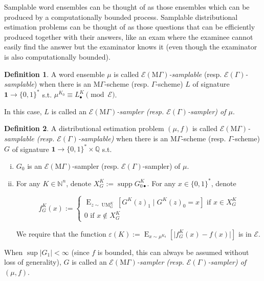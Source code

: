\documentclass{article}
\numberwithin{equation}{section}
\theoremstyle{definition}
\newtheorem{definition}{Definition}[section]
\theoremstyle{plain}
\newcommand{\Bool}{\{0,1\}}
\newcommand{\Words}{{\Bool^*}}
\DeclareMathOperator{\Supp}{supp}
\DeclareMathOperator{\E}{E}
\DeclareMathOperator{\UM}{UM}
\newcommand{\Nats}{\mathbb{N}}
\newcommand{\Rats}{\mathbb{Q}}
\newcommand{\Abs}[1]{\lvert #1 \rvert}
\newcommand{\MGrow}{\mathrm{M}\Gamma}
\newcommand{\Fall}{\mathcal{E}}
\newcommand{\EG}{\Fall(\Gamma)}
\newcommand{\EMG}{\Fall(\MGrow)}
\begin{document}
Samplable word ensembles can be thought of as those ensembles which can be produced by a computationally bounded process. Samplable distributional estimation problems can be thought of as those questions that can be efficiently produced together with their answers, like an exam where the examinee cannot easily find the answer but the examinator knows it (even though the examinator is also computationally bounded).

\begin{samepage}
\begin{definition}

A word ensemble $\mu$ is called \emph{$\EMG$-samplable} (resp. \emph{$\EG$-samplable}) when there is an $\MGrow$-scheme (resp. $\Gamma$-scheme) $L$ of signature ${\bm{1} \rightarrow \Words}$  s.t. $\mu^{K_0} \equiv L_\bullet^K \pmod \Fall$.

In this case, $L$ is called an \emph{$\EMG$-sampler (resp. $\EG$-sampler) of $\mu$}.

\end{definition}
\end{samepage}

\begin{samepage}
\begin{definition}

A distributional estimation problem $(\mu,f)$ is called \emph{$\EMG$-samplable (resp. $\EG$-samplable)} when there is an $\MGrow$-scheme (resp. $\Gamma$-scheme) $G$ of signature $\bm{1} \rightarrow \Words \times \Rats$ s.t. 

\begin{enumerate}[(i)]

\item $G_0$ is an $\EMG$-sampler (resp. $\EG$-sampler) of $\mu$.

\item For any $K \in \Nats^n$, denote $X_{G}^K:=\Supp G_{0\bullet}^K$. For any $x \in \Words$, denote 

$$f_G^K(x):=\begin{cases}\E_{z \sim\UM_G^K}[G^K(z)_1 \mid G^K(z)_0 = x] \text{ if } x \in X_{G}^K \\ 0 \text{ if } x \not\in X_{G}^K \end{cases}$$

We require that the function $\varepsilon(K):=\E_{x \sim \mu^{K_0}}[\Abs{f_G^K(x)-f(x)}]$ is in $\Fall$.

\end{enumerate}

When $\sup{\Abs{G_1}} < \infty$ (since $f$ is bounded, this can always be assumed without loss of generality), $G$ is called an \emph{$\EMG$-sampler (resp. $\EG$-sampler) of $(\mu,f)$}.

\end{definition}
\end{samepage}
\end{document}
